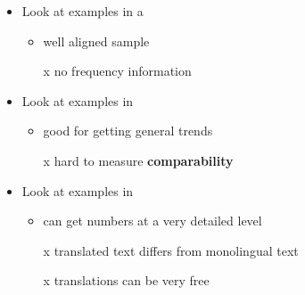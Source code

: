 \documentclass[a4paper,landscape,headrule,footrule,xetex]{foils}
\begin{document}

\begin{itemize}
\item Look at examples in a 
  \begin{itemize}
  \item well aligned sample
  \item[x] no frequency information
  \end{itemize}
\item Look at examples in  
  \begin{itemize}
  \item good for getting general trends
  \item[x] hard to measure \textbf{comparability}
  \end{itemize}
\item Look at examples in  
  \begin{itemize}
  \item can get numbers at a very detailed level
  \item[x] translated text differs from monolingual text
  \item[x] translations can be very free
  \end{itemize}
\end{itemize}


\end{document}
